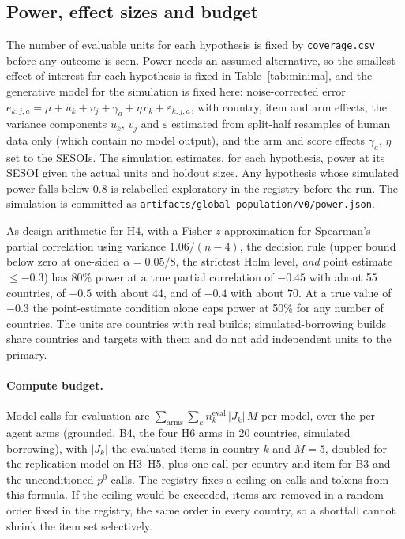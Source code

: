 \documentclass[10pt]{article}
\begin{document}
\subsection{Power, effect sizes and budget}
\label{sec:power}

The number of evaluable units for each hypothesis is fixed by \nolinkurl{coverage.csv} before any outcome is seen. Power needs an assumed alternative, so the smallest effect of interest for each hypothesis is fixed in Table~\ref{tab:minima}, and the generative model for the simulation is fixed here: noise-corrected error $e_{k,j,a} = \mu + u_k + v_j + \gamma_a + \eta\,c_k + \varepsilon_{k,j,a}$, with country, item and arm effects, the variance components $u_k$, $v_j$ and $\varepsilon$ estimated from split-half resamples of human data only (which contain no model output), and the arm and score effects $\gamma_a$, $\eta$ set to the SESOIs. The simulation estimates, for each hypothesis, power at its SESOI given the actual units and holdout sizes. Any hypothesis whose simulated power falls below 0.8 is relabelled exploratory in the registry before the run. The simulation is committed as \nolinkurl{artifacts/global-population/v0/power.json}.

As design arithmetic for H4, with a Fisher-$z$ approximation for Spearman's partial correlation using variance $1.06/(n-4)$, the decision rule (upper bound below zero at one-sided $\alpha = 0.05/8$, the strictest Holm level, \emph{and} point estimate $\le -0.3$) has 80\% power at a true partial correlation of $-0.45$ with about 55 countries, of $-0.5$ with about 44, and of $-0.4$ with about 70. At a true value of $-0.3$ the point-estimate condition alone caps power at 50\% for any number of countries. The units are countries with real builds; simulated-borrowing builds share countries and targets with them and do not add independent units to the primary.

\paragraph{Compute budget.} Model calls for evaluation are $\sum_{\text{arms}}\sum_k n^{\text{eval}}_k\,|J_k|\,M$ per model, over the per-agent arms (grounded, B4, the four H6 arms in 20 countries, simulated borrowing), with $|J_k|$ the evaluated items in country $k$ and $M = 5$, doubled for the replication model on H3--H5, plus one call per country and item for B3 and the unconditioned $p^0$ calls. The registry fixes a ceiling on calls and tokens from this formula. If the ceiling would be exceeded, items are removed in a random order fixed in the registry, the same order in every country, so a shortfall cannot shrink the item set selectively.
\end{document}

